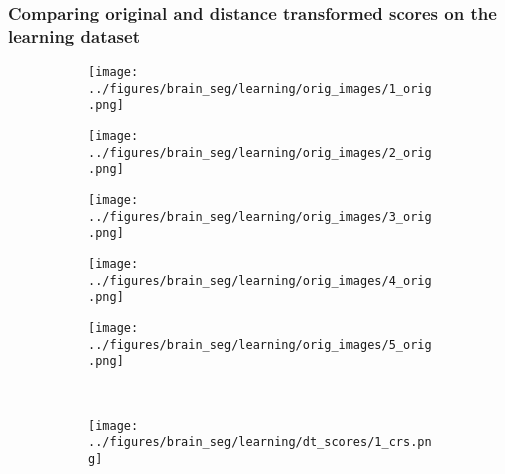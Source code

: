 \subsubsection{Comparing original and distance transformed scores on the learning dataset}\label{brainlearn}
\begin{figure}[h!] %
	\centering
			\begin{subfigure}[b]{0.03\textwidth} %
		\centering
	\end{subfigure}
	\hspace{0.1cm}
	\begin{subfigure}{0.16\textwidth}
		\centering
		\texttt{[image: ../figures/brain\_seg/learning/orig\_images/1\_orig.png]}
		\label{fig:1}
	\end{subfigure}
	\begin{subfigure}{0.16\textwidth}
		\centering
		\texttt{[image: ../figures/brain\_seg/learning/orig\_images/2\_orig.png]}
		\label{fig:2}
	\end{subfigure}
	\begin{subfigure}{0.16\textwidth}
		\centering
		\texttt{[image: ../figures/brain\_seg/learning/orig\_images/3\_orig.png]}
		\label{fig:3}
	\end{subfigure}
	\begin{subfigure}{0.16\textwidth}
		\centering
		\texttt{[image: ../figures/brain\_seg/learning/orig\_images/4\_orig.png]}
		\label{fig:4}
	\end{subfigure}
	\begin{subfigure}{0.16\textwidth}
		\centering
		\texttt{[image: ../figures/brain\_seg/learning/orig\_images/5\_orig.png]}
		\label{fig:5}
	\end{subfigure}
	\\
	\vspace{-0.35cm}
		\begin{subfigure}[b]{0.03\textwidth} %
		\centering
	\end{subfigure}
	\hspace{0.1cm}
	\begin{subfigure}{0.16\textwidth}
		\centering
		\texttt{[image: ../figures/brain\_seg/learning/dt\_scores/1\_crs.png]}

\end{subfigure}
\end{figure}
